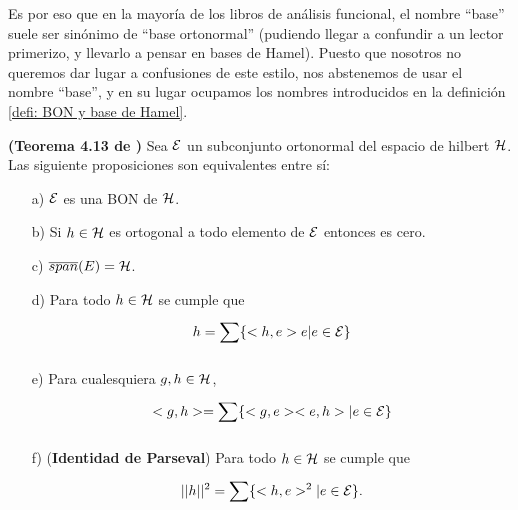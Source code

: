 Es por eso que en la mayoría
de los libros de análisis funcional, el nombre ``base''
suele ser sinónimo de 
``base ortonormal''
(pudiendo llegar a confundir
a un lector primerizo, y llevarlo a pensar en
bases de Hamel). Puesto que
nosotros no queremos dar lugar a confusiones de este estilo,
nos abstenemos de usar el nombre ``base'', y en su lugar ocupamos
los nombres introducidos en la definición \ref{defi: BON y base de Hamel}.


\begin{teo} \label{thm: Coway, 4.13}
\textbf{(Teorema 4.13 de \cite{conway} )}
Sea $\mathcal{E}$ un subconjunto ortonormal del espacio
de hilbert $\mathcal{H}$.
Las siguiente proposiciones son equivalentes entre sí:
\begin{itemize}
\item[a)] $\mathcal{E}$ es una BON de $\mathcal{H}$.
\item[b)] Si $h \in \mathcal{H}$ es ortogonal a todo elemento de 
$\mathcal{E}$ entonces es cero.
\item[c)] $\overline{span}(E)= \mathcal{H} $.
\item[d)] Para todo $h \in \mathcal{H}$ se cumple que
\[
h = \sum\limits_{}^{}\{ <h,e> e | e \in \mathcal{E} \}
\]
\item[e)] Para cualesquiera $g, h \in \mathcal{H}$,
\[
<g,h>= \sum\limits_{}^{}\{ <g,e> <e,h> | e \in \mathcal{E} \}
\]
\item[f)](\textbf{Identidad de Parseval})
Para todo $h \in \mathcal{H}$ se cumple que
\[
||h||^{2}= \sum\limits_{}^{}\{ <h,e>^{2} | e \in \mathcal{E} \}.
\]
\end{itemize}
\end{teo}


